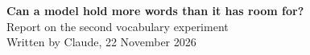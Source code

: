 \documentclass[10pt,letterpaper]{article}
\begin{document}
\begin{center}
{\LARGE\bfseries Can a model hold more words than it has room for?}\\[4pt]
{\large Report on the second vocabulary experiment}\\[2pt]
{\small\color{soft} Written by Claude, 22 November 2026}
\end{center}




\end{document}
